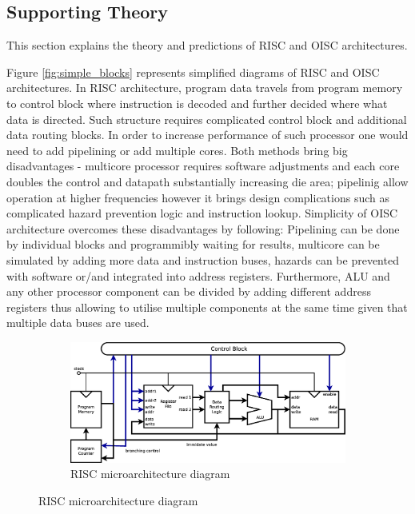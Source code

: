 \documentclass[a4paper,12pt]{article}
\begin{document}
\begin{multicols}{2}
\subsection{Supporting Theory} \label{sec:theory}
This section explains the theory and predictions of RISC and OISC architectures.

Figure \ref{fig:simple_blocks} represents simplified diagrams of RISC and OISC architectures. In RISC architecture, program data travels from program memory to control block where instruction is decoded and further decided where what data is directed. Such structure requires complicated control block and additional data routing blocks. In order to increase performance of such processor one would need to add pipelining or add multiple cores. Both methods bring big disadvantages - multicore processor requires software adjustments and each core doubles the control and datapath substantially increasing die area; pipelinig allow operation at higher frequencies however it brings design complications such as complicated hazard prevention logic and instruction lookup. Simplicity of OISC architecture overcomes these disadvantages by following:
Pipelining can be done by individual blocks and programmibly waiting for results, multicore can be simulated by adding more data and instruction buses, hazards can be prevented with software or/and integrated into address registers. 
Furthermore, ALU and any other processor component can be divided by adding different address registers thus allowing to utilise multiple components at the same time given that multiple data buses are used. 

\begin{figure}[h!]
	\centering
	\begin{subfigure}[b]{1\textwidth}
		\includegraphics[width=\linewidth]{graphics/risc.eps}
		\caption{RISC microarchitecture diagram}
		\label{fig:risc_simple}
	\end{subfigure}
	

\end{figure}
\end{multicols}
\end{document}
